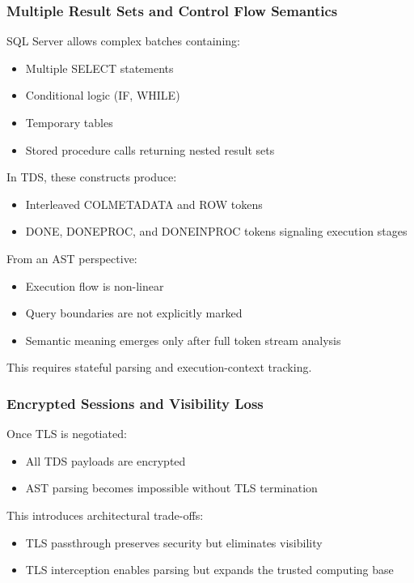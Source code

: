 \subsubsection{Multiple Result Sets and Control Flow Semantics}

SQL Server allows complex batches containing:
\begin{itemize}
    \item Multiple SELECT statements
    \item Conditional logic (IF, WHILE)
    \item Temporary tables
    \item Stored procedure calls returning nested result sets
\end{itemize}

In TDS, these constructs produce:
\begin{itemize}
    \item Interleaved COLMETADATA and ROW tokens
    \item DONE, DONEPROC, and DONEINPROC tokens signaling execution stages
\end{itemize}

From an AST perspective:
\begin{itemize}
    \item Execution flow is non-linear
    \item Query boundaries are not explicitly marked
    \item Semantic meaning emerges only after full token stream analysis
\end{itemize}

This requires stateful parsing and execution-context tracking.

\subsubsection{Encrypted Sessions and Visibility Loss}

Once TLS is negotiated:
\begin{itemize}
    \item All TDS payloads are encrypted
    \item AST parsing becomes impossible without TLS termination
\end{itemize}

This introduces architectural trade-offs:
\begin{itemize}
    \item TLS passthrough preserves security but eliminates visibility
    \item TLS interception enables parsing but expands the trusted computing base
\end{itemize}

